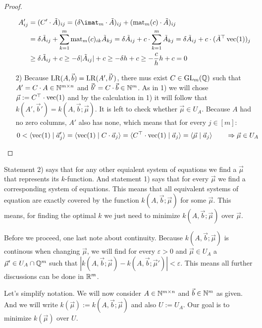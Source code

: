 \begin{proof}
\begin{enumerate}
        \begin{align*}
            A'_{ij} &= (C'\cdot \tilde A)_{ij} = (\delta\imat_m \cdot \tilde A)_{ij} + (\opmat_m(c)\cdot \tilde A)_{ij}\\
            &= \delta \tilde A_{ij} + \sum_{k=1}^{m}\opmat_m(c)_{ik} \tilde A_{kj} = \delta \tilde A_{ij} + c \cdot \sum_{k=1}^{m} \tilde A_{kj} = \delta \tilde A_{ij} + c \cdot (\tilde A^\top \opvec(1))_j\\
            &\geq \delta \tilde A_{ij} + c \geq -\delta |\tilde A_{ij}| + c \geq - \delta h + c \geq -\frac{c}{h}h + c = 0
        \end{align*}
        
        \item[2)] Because $\operatorname{LR}(A, \vec b) = \operatorname{LR}(A', \vec b')$, there mus exist $C \in \operatorname{GL}_m(\mathbb{Q})$ such that $A' = C \cdot A \in \mathbb{N}^{m \times n}$ and $\vec b' = C \cdot \vec b \in \mathbb{N}^m$. As in 1) we will chose $\vec \mu := C^\top \cdot \operatorname{vec}(1)$ and by the calculation in 1) it will follow that $k(A', \vec b') = k(A, \vec b; \vec\mu)$. It is left to check whether $\vec \mu \in U_A$. Because $A$ had no zero columns, $A'$ also has none, which means that for every $j \in [m]$:
        $$0 < \langle \operatorname{vec}(1) \mid \vec a'_j \rangle = \langle \operatorname{vec}(1) \mid C \cdot \vec a_j \rangle = \langle C^\top \cdot \operatorname{vec}(1) \mid \vec a_j \rangle = \langle \vec \mu \mid \vec a_j \rangle \qquad \Rightarrow\vec \mu \in U_A$$

    \end{enumerate}
\end{proof}

Statement 2) says that for any other equialent system of equations we find a $\vec \mu$ that represents its $k$-function. And statement 1) says that for every $\vec \mu$ we find a corresponding system of equations. This means that all equivalent systems of equation are exactly covered by the function $k(A, \vec b; \vec\mu)$ for some $\vec \mu$. This means, for finding the optimal $k$ we just need to minimize $k(A, \vec b; \vec \mu)$ over $\vec \mu$.

Before we proceed, one last note about continuity. Because $k(A, \vec b; \vec \mu)$ is continous when changing $\vec\mu$, we will find for every $\varepsilon > 0$ and $\vec\mu \in U_A$ a $\vec\mu' \in U_A \cap \mathbb{Q}^m$ such that $|k(A, \vec b; \vec \mu) - k(A, \vec b; \vec \mu')| < \varepsilon$. This means all further discussions can be done in $\mathbb{R}^m$.

Let's simplify notation. We will now consider $A \in \mathbb{N}^{m \times n}$ and $\vec b \in \mathbb{N}^m$ as given. And we will write $k(\vec \mu) := k(A, \vec b; \vec \mu)$ and also $U := U_A$. Our goal is to minimize $k(\vec \mu)$ over $U$.

